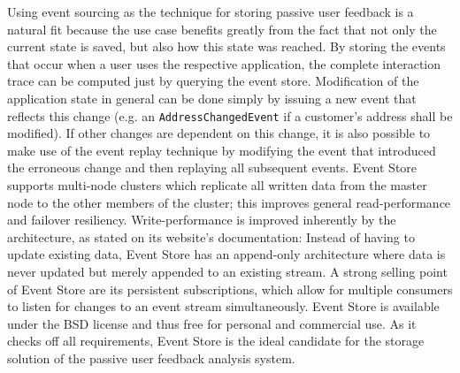 \begin{table}[b]
\centering
\caption{Classification of storage solutions; the requirements regarding basic storage capabilities and modifying data are not listed because all solutions satisfy these.}
\label{table:classifications:storage}
\end{table}

Using event sourcing as the technique for storing passive user feedback is a natural fit because the use case benefits greatly from the fact that not only the current state is saved, but also how this state was reached.
By storing the events that occur when a user uses the respective application, the complete interaction trace can be computed just by querying the event store.
Modification of the application state in general can be done simply by issuing a new event that reflects this change (e.g. an \texttt{AddressChangedEvent} if a customer's address shall be modified).
If other changes are dependent on this change, it is also possible to make use of the event replay technique by modifying the event that introduced the erroneous change and then replaying all subsequent events.
Event Store supports multi-node clusters which replicate all written data from the master node to the other members of the cluster; this improves general read-performance and failover resiliency.
Write-performance is improved inherently by the architecture, as stated on its website's documentation:
Instead of having to update existing data, Event Store has an append-only architecture where data is never updated but merely appended to an existing stream.
A strong selling point of Event Store are its persistent subscriptions, which allow for multiple consumers to listen for changes to an event stream simultaneously.
Event Store is available under the BSD license and thus free for personal and commercial use.
As it checks off all requirements, Event Store is the ideal candidate for the storage solution of the passive user feedback analysis system.

